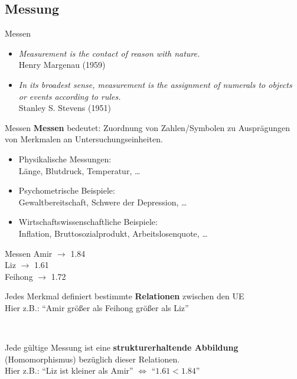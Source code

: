 \documentclass[
  10pt,
  ignorenonframetext,
]{beamer}
\providecommand{\tightlist}{%
  \setlength{\itemsep}{0pt}\setlength{\parskip}{0pt}}
\begin{document}
\subsection{Messung}\label{messung}

\begin{frame}{Messen}
\label{messen}
\begin{itemize}[<+->]
\tightlist
\item
  \emph{Measurement is the contact of reason with nature.}\\
  Henry Margenau (1959)
\end{itemize}

\begin{itemize}[<+->]
\tightlist
\item
  \emph{In its broadest sense, measurement is the assignment of numerals
  to objects or events according to rules.}\\
  Stanley S. Stevens (1951)
\end{itemize}
\end{frame}

\begin{frame}{Messen}
\label{messen-1}
\textbf{Messen} bedeutet: Zuordnung von Zahlen/Symbolen zu Ausprägungen
von Merkmalen an Untersuchungseinheiten.

\begin{itemize}
\tightlist
\item
  Physikalische Messungen:\\
  Länge, Blutdruck, Temperatur, \ldots{}\\
\item
  Psychometrische Beispiele:\\
  Gewaltbereitschaft, Schwere der Depression, \ldots{}
\item
  Wirtschaftswissenschaftliche Beispiele:\\
  Inflation, Bruttosozialprodukt, Arbeitslosenquote, \ldots{}
\end{itemize}
\end{frame}

\begin{frame}{Messen}
\label{messen-2}
Amir \(\longrightarrow\) 1.84\\
Liz \(\longrightarrow\) 1.61\\
Feihong \(\longrightarrow\) 1.72

Jedes Merkmal definiert bestimmte \textbf{Relationen} zwischen den UE\\
Hier z.B.: ``Amir größer als Feihong größer als Liz''\\
\strut ~

Jede gültige Messung ist eine \textbf{strukturerhaltende Abbildung}
(Homomorphismus) bezüglich dieser Relationen.\\
Hier z.B.: ``Liz ist kleiner als Amir'' \(\iff\) ``\(1.61 < 1.84\)''
\end{frame}
\end{document}
